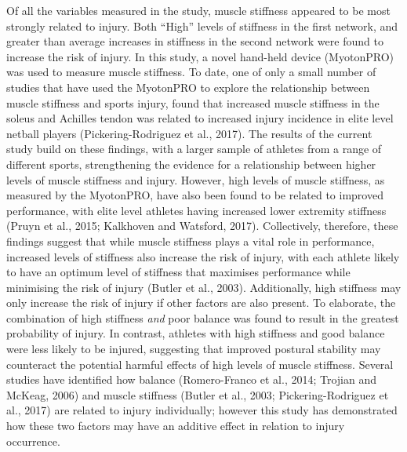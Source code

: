 \documentclass[
  english,
  man]{apa6}
\begin{document}
Of all the variables measured in the study, muscle stiffness appeared to be most strongly related to injury.
Both ``High'' levels of stiffness in the first network, and greater than average increases in stiffness in the second network were found to increase the risk of injury.
In this study, a novel hand-held device (MyotonPRO) was used to measure muscle stiffness.
To date, one of only a small number of studies that have used the MyotonPRO to explore the relationship between muscle stiffness and sports injury, found that increased muscle stiffness in the soleus and Achilles tendon was related to increased injury incidence in elite level netball players (Pickering-Rodriguez et al., 2017).
The results of the current study build on these findings, with a larger sample of athletes from a range of different sports, strengthening the evidence for a relationship between higher levels of muscle stiffness and injury.
However, high levels of muscle stiffness, as measured by the MyotonPRO, have also been found to be related to improved performance, with elite level athletes having increased lower extremity stiffness (Pruyn et al., 2015; Kalkhoven and Watsford, 2017).
Collectively, therefore, these findings suggest that while muscle stiffness plays a vital role in performance, increased levels of stiffness also increase the risk of injury, with each athlete likely to have an optimum level of stiffness that maximises performance while minimising the risk of injury (Butler et al., 2003).
Additionally, high stiffness may only increase the risk of injury if other factors are also present.
To elaborate, the combination of high stiffness \emph{and} poor balance was found to result in the greatest probability of injury.
In contrast, athletes with high stiffness and good balance were less likely to be injured, suggesting that improved postural stability may counteract the potential harmful effects of high levels of muscle stiffness.
Several studies have identified how balance (Romero-Franco et al., 2014; Trojian and McKeag, 2006) and muscle stiffness (Butler et al., 2003; Pickering-Rodriguez et al., 2017) are related to injury individually; however this study has demonstrated how these two factors may have an additive effect in relation to injury occurrence.
\end{document}
